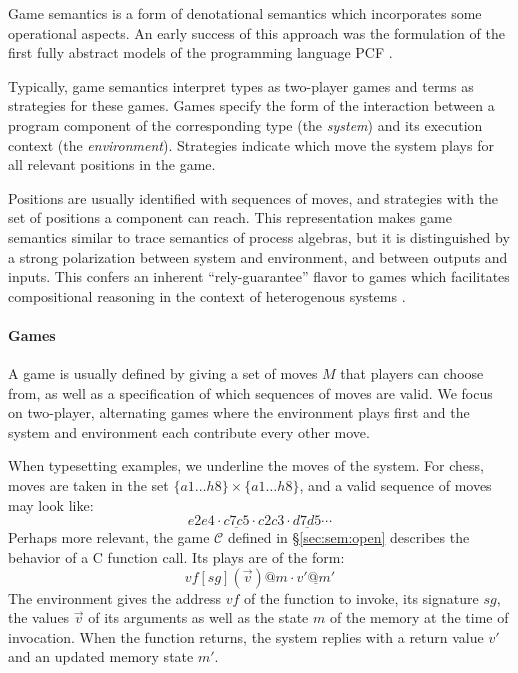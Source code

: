 \documentclass[sigplan,10pt,review,anonymous]{acmart}
\begin{document}

Game semantics is a form of denotational semantics which
incorporates some operational aspects.
An early success of this approach was
the formulation of the first fully abstract models
of the programming language PCF \cite{pcfajm,pcfho}.

Typically,
game semantics interpret
types as two-player games
and terms as strategies for these games.
Games specify the form of the interaction
between a program component of the corresponding type
(the \emph{system})
and its execution context
(the \emph{environment}).
Strategies
indicate which move the system plays
for all relevant positions in the game.

Positions are usually identified with sequences of moves,
and strategies with the set of positions
a component can reach.
This representation makes
game semantics similar to
trace semantics of process algebras,
but it is distinguished
by a strong polarization between
system and environment,
and between outputs and inputs.
This confers an inherent ``rely-guarantee'' flavor
to games which facilitates compositional reasoning
in the context of heterogenous systems \cite{cspgs}.


\paragraph{Games} \label{sec:mainideas:gs:games} %

A game is usually defined by giving a set of moves $M$
that players can choose from,
as well as a specification of which
sequences of moves are valid.
We focus on two-player, alternating games
where the environment plays first and
the system and environment
each contribute every other move.

When typesetting examples,
we underline the moves of the system.
For chess,
moves are taken in the set $\{a1 \ldots h8\} \times \{a1 \ldots h8\}$,
and a valid sequence of moves may look like:
\[ e2e4 \cdot \underline{c7c5} \cdot c2c3 \cdot \underline{d7d5} \cdots \]
Perhaps more relevant,
the game $\mathcal{C}$ defined in \S\ref{sec:sem:open}
describes the behavior of a C function call.
Its plays are of the form:
\[ \mathit{vf}[\mathit{sg}](\vec{v})@m \cdot \underline{v'@m'} \]
The environment gives the address $\mathit{vf}$
of the function to invoke,
its signature $\mathit{sg}$,
the values $\vec{v}$ of its arguments
as well as the state $m$ of the memory
at the time of invocation.
When the function returns,
the system replies with
a return value $v'$
and an updated memory state $m'$.
\end{document}
